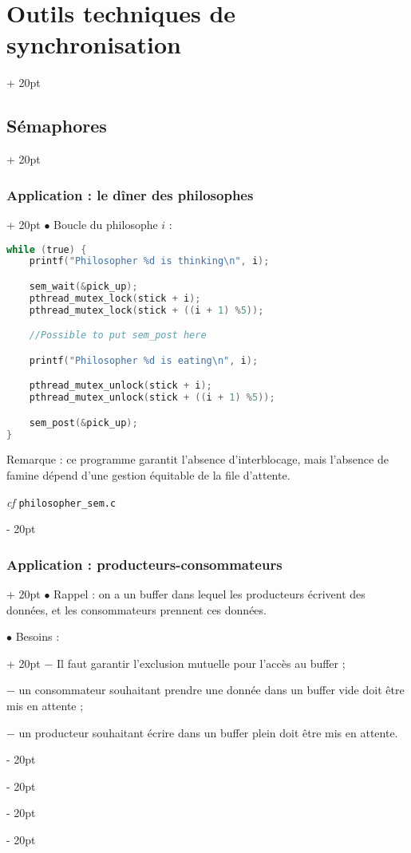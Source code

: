 \documentclass[a4paper, 12pt, twoside]{article}
\newcommand{\ind}[1][20pt]{\advance\leftskip + #1}
\newcommand{\deind}[1][20pt]{\advance\leftskip - #1}
\newenvironment{indt}[2][20pt]{#2 \par \ind[#1]}{\par \deind} %
\begin{document}
\begin{indt}{\section{Outils techniques de synchronisation}}
\begin{indt}{\subsection{Sémaphores}}
\begin{indt}{\subsubsection{Application : le dîner des philosophes}}
                $\bullet$ Boucle du philosophe $i$ :

                \begin{lstlisting}[language=C, xleftmargin=80pt]
while (true) {
    printf("Philosopher %d is thinking\n", i);

    sem_wait(&pick_up);
    pthread_mutex_lock(stick + i);
    pthread_mutex_lock(stick + ((i + 1) %5));

    //Possible to put sem_post here

    printf("Philosopher %d is eating\n", i);

    pthread_mutex_unlock(stick + i);
    pthread_mutex_unlock(stick + ((i + 1) %5));

    sem_post(&pick_up);
}\end{lstlisting}

                Remarque : ce programme garantit l'absence d'interblocage, mais l'absence de famine dépend d'une gestion équitable de la file d'attente.

                \vspace{12pt}
                
                \textit{cf} \texttt{philosopher\_sem.c}
            \end{indt}

            \vspace{12pt}
            
            \begin{indt}{\subsubsection{Application : producteurs-consommateurs}}
                $\bullet$  Rappel : on a un buffer dans lequel les producteurs écrivent des données, et les consommateurs prennent ces données.

                \vspace{6pt}
                
                \begin{indt}{$\bullet$ Besoins :}
                    $-$ Il faut garantir l'exclusion mutuelle pour l'accès au buffer ;

                    $-$ un consommateur souhaitant prendre une donnée dans un buffer vide doit être mis en attente ;

                    $-$ un producteur souhaitant écrire dans un buffer plein doit être mis en attente.
                \end{indt}


\end{indt}
\end{indt}
\end{indt}
\end{document}
